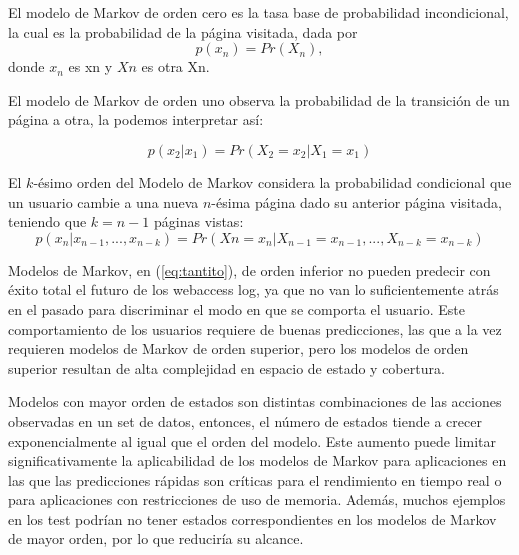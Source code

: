  El modelo de Markov de orden cero es la tasa base de probabilidad incondicional, la cual es la probabilidad de la página visitada, dada por
 \begin{equation}
p(x_n) = Pr(X_n),
 \end{equation}	
 donde $x_{n}$ es xn y $Xn$ es otra Xn.
 
 El modelo de Markov de orden uno observa la probabilidad de la transición de un página a otra, la podemos interpretar así:
 
 \begin{equation} 
	 p(x_{2} | x_1) = Pr(X_2 = x_2 | X_1 = x_1) 
 \end{equation}	
 
 El $k$-ésimo orden del Modelo de Markov considera la probabilidad condicional que un usuario cambie a una nueva  $n$-ésima página  dado su anterior página visitada, teniendo que $k = n -1$ páginas vistas:
 \begin{equation}\label{eq:tantito}
p( x_{n} | x_{n-1},..., x_{n-k} ) = Pr(X{n} = x_{n} | X_{n-1} = x_{n-1},..., X_{n-k} = x_{n-k}) 
 \end{equation}


 
 
 Modelos de Markov, en (\ref{eq:tantito}), de orden inferior no pueden predecir con éxito total el futuro de los webaccess log, ya que no van lo suficientemente atrás en el pasado para discriminar el modo en que se comporta el usuario. Este comportamiento de los usuarios requiere de buenas predicciones, las que a la vez requieren modelos de Markov de orden superior, pero los modelos de orden superior resultan de alta complejidad en espacio de estado y cobertura. 
 
Modelos con mayor orden de estados son distintas combinaciones de las acciones observadas en un set de datos, entonces, el número de estados tiende a crecer exponencialmente al igual que el orden del modelo. 
Este aumento puede limitar significativamente la aplicabilidad de los modelos de Markov para aplicaciones en las que las predicciones rápidas son críticas para el rendimiento en tiempo real o para aplicaciones con restricciones de uso de memoria. Además, muchos ejemplos en los test podrían no tener estados correspondientes en los modelos de Markov de mayor orden, por lo que reduciría su alcance.